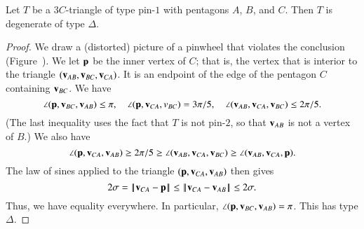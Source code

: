 
\begin{lemma} Let $T$ be a $3C$-triangle of type pin-$1$ with
  pentagons $A$, $B$, and $C$.  Then $T$ is degenerate of type
  $\Delta$.
\end{lemma}


\begin{proof}  We draw a (distorted) picture of a
  pinwheel that violates the conclusion (Figure~).
  We let ${\mathbf p}$ be the inner vertex of $C$; that is, the vertex that is
  interior to the triangle $({\mathbf v}_{AB},{\mathbf v}_{BC},{\mathbf v}_{CA})$.  It is an
  endpoint of the edge of the pentagon $C$ containing ${\mathbf v}_{BC}$.  We have
\[
\angle ({\mathbf p},{\mathbf v}_{BC},{\mathbf v}_{AB}) \le \pi,\quad \angle({\mathbf p},{\mathbf v}_{CA},v_{BC}) = 3\pi/5,\quad
\angle({\mathbf v}_{AB},{\mathbf v}_{CA},{\mathbf v}_{BC})\le 2\pi/5.
\]
(The last inequality uses the fact that $T$ is not pin-$2$, so
that ${\mathbf v}_{AB}$ is not a vertex of $B$.)
We also have
\[
\angle({\mathbf p},{\mathbf v}_{CA},{\mathbf v}_{AB}) \ge 2\pi /5 \ge \angle({\mathbf v}_{AB},{\mathbf v}_{CA},{\mathbf v}_{BC}) \ge \angle({\mathbf v}_{AB},{\mathbf v}_{CA},{\mathbf p}).
\]
The law of sines applied to the triangle $({\mathbf p},{\mathbf v}_{CA},{\mathbf v}_{AB})$ then gives
\[
2\sigma =\norm{\v_{CA}}{\p}\le\norm{\v_{CA}}{\v_{AB}}\le 2\sigma.
\]
Thus, we have equality everywhere.  In particular, $\angle({\mathbf p},{\mathbf v}_{BC},{\mathbf v}_{AB})=\pi$.  This
has type $\Delta$.
\end{proof}


